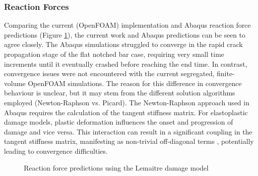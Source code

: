 \documentclass[sn-mathphys,Numbered]{sn-jnl}%
\begin{document}
\subsubsection{Reaction Forces}
Comparing the current (OpenFOAM) implementation and Abaqus reaction force predictions (Figure \ref{fig:lemaitre_forces}), the current work and Abaqus predictions can be seen to agree closely. 
The Abaqus simulations struggled to converge in the rapid crack propagation stage of the flat notched bar case, requiring very small time increments until it eventually crashed before reaching the end time.
In contrast, convergence issues were not encountered with the current segregated, finite-volume OpenFOAM simulations.
The reason for this difference in convergence behaviour is unclear, but it may stem from the different solution algorithms employed (Newton-Raphson vs. Picard).
The Newton-Raphson approach used in Abaqus requires the calculation of the tangent stiffness matrix.
For elastoplastic damage models, plastic deformation influences the onset and progression of damage and vice versa.
This interaction can result in a significant coupling in the tangent stiffness matrix, manifesting as non-trivial off-diagonal terms \cite{bathe_finite_1996}, potentially leading to convergence difficulties.
\begin{figure}[htbp]
	\centering
		\caption{Reaction force predictions using the Lemaitre damage model}
	\label{fig:lemaitre_forces}
\end{figure}
\end{document}
